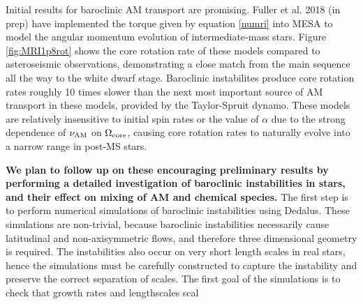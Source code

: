 Initial results for baroclinic AM transport are promising. Fuller et al. 2018 (in prep) have implemented the torque given by equation \ref{numri} into MESA to model the angular momentum evolution of intermediate-mass stars. Figure \ref{fig:MRI1p8rot} shows the core rotation rate of these models compared to asteroseismic observations, demonstrating a close match from the main sequence all the way to the white dwarf stage. Baroclinic instabilites produce core rotation rates roughly 10 times slower than the next most important source of AM transport in these models, provided by the Taylor-Spruit dynamo. These models are relatively insensitive to initial spin rates or the value of $\alpha$ due to the strong dependence of $\nu_{\rm AM}$ on $\Omega_{\rm core}$, causing core rotation rates to naturally evolve into a narrow range in post-MS stars.

{\bf We plan to follow up on these encouraging preliminary results by performing a detailed investigation of baroclinic instabilities in stars, and their effect on mixing of AM and chemical species.} The first step is to perform numerical simulations of baroclinic instabilities using Dedalus. These simulations are non-trivial, because baroclinic instabilities necessarily cause latitudinal and non-axisymmetric flows, and therefore three dimensional geometry is required. The instabilities also occur on very short length scales in real stars, hence the simulations must be carefully constructed to capture the instability and preserve the correct separation of scales. The first goal of the simulations is to check that growth rates and lengthscales scal